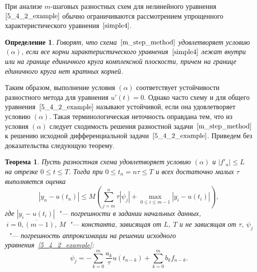 \documentclass[11pt,a4paper,twoside,listtotoc,bibtotoc]{report}
\numberwithin{equation}{section}
\newtheorem*{definition}{Определение}
\theoremstyle{definition}
\theoremstyle{plain}
\newtheorem*{theorem*}{Теорема}
\begin{document}
При анализе $m$-шаговых разностных схем для нелинейного уравнения
$\eqref{5_4_2_example}$ обычно ограничиваются рассмотрением упрощенного
характеристического уравнения~$\eqref{simple4}$.
%
\begin{definition}
%
    Говорят, что схема~$\eqref{m_step_method}$ удовлетворяет условию $(\alpha)$,
    если все корни характеристического уравнения~$\eqref{simple4}$ лежат внутри или на границе
    единичного круга комплексной плоскости, причем на границе единичного круга
    нет кратных корней.
%
\end{definition}
%
Таким образом, выполнение условия $(\alpha)$ соответствует устойчивости
разностного метода для уравнения $u'(t)=0$. Однако часто схему и для общего
уравнения~$\eqref{5_4_2_example}$ называют устойчивой, если она удовлетворяет условию
$(\alpha)$. Такая терминологическая неточность оправдана тем, что из условия
$(\alpha)$ следует сходимость решения разностной задачи~$\eqref{m_step_method}$
к решению исходной дифференциальной задачи~$\eqref{5_4_2_example}$. Приведем без
доказательства следующую теорему.
%
\begin{theorem*}
%
    Пусть разностная схема удовлетворяет условию $(\alpha)$ и $|f'_u|\leqslant L$
    на отрезке $0 \leqslant t \leqslant T$. Тогда при $0 \leqslant t_n = n\tau
    \leqslant T$ и всех достаточно малых $\tau$ выполняется оценка
    $$
        |y_n-u(t_n)| \leqslant M\left(\sum\limits_{j=m}^n\tau|\psi_j| +
        \max_{0 \leqslant i \leqslant m-1}|y_i - u(t_i)|\right),
    $$
    где $|y_i-u(t_i)|$~"--- погрешности в задании начальных данных,
    $~i=\overline{0,(m-1)}$, $M$~"--- константа, зависящая от
    $L,~T$ и не зависящая от $\tau$, $\psi_j$~"--- погрешность аппроксимации на решении исходного
    уравнения~\eqref{5_4_2_example}:
    $$
        \psi_j = -\sum\limits_{k=0}^m\dfrac{a_k}{\tau}u(t_{n-k}) + \sum\limits_{k=0}^mb_kf_{n-k}.
    $$
%
\end{theorem*}
%
\end{document}
